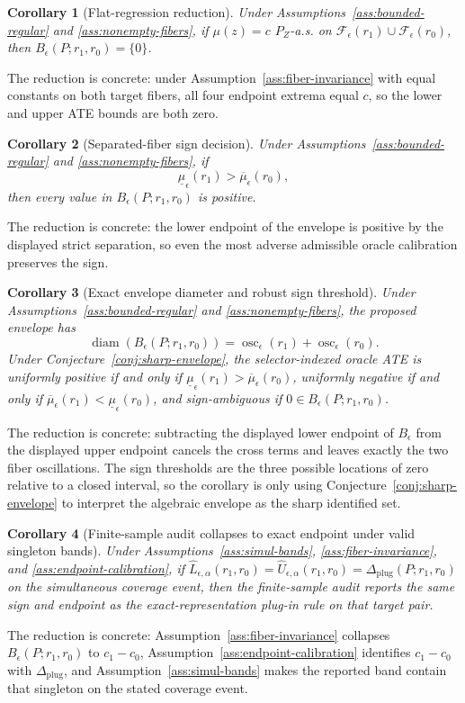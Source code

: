 \documentclass[11pt]{article}
\theoremstyle{definition}
\theoremstyle{plain}
\newtheorem{corollary}{Corollary}
\theoremstyle{remark}
\begin{document}
\begin{corollary}[Flat-regression reduction]\label{cor:flat}
Under Assumptions~\ref{ass:bounded-regular} and \ref{ass:nonempty-fibers}, if \(\mu(z)=c\) \(P_Z\)-a.s. on \(\mathcal F_\epsilon(r_1)\cup\mathcal F_\epsilon(r_0)\), then \(B_\epsilon(P;r_1,r_0)=\{0\}\).
\end{corollary}
The reduction is concrete: under Assumption~\ref{ass:fiber-invariance} with equal constants on both target fibers, all four endpoint extrema equal \(c\), so the lower and upper ATE bounds are both zero.

\begin{corollary}[Separated-fiber sign decision]\label{cor:separated}
Under Assumptions~\ref{ass:bounded-regular} and \ref{ass:nonempty-fibers}, if
\[
\underline\mu_\epsilon(r_1)>
\overline\mu_\epsilon(r_0),
\]
then every value in \(B_\epsilon(P;r_1,r_0)\) is positive.
\end{corollary}
The reduction is concrete: the lower endpoint of the envelope is positive by the displayed strict separation, so even the most adverse admissible oracle calibration preserves the sign.

\begin{corollary}[Exact envelope diameter and robust sign threshold]\label{cor:diameter-sign}
Under Assumptions~\ref{ass:bounded-regular} and \ref{ass:nonempty-fibers}, the proposed envelope has
\[
\operatorname{diam}(B_\epsilon(P;r_1,r_0))
=
\operatorname{osc}_\epsilon(r_1)+\operatorname{osc}_\epsilon(r_0).
\]
Under Conjecture~\ref{conj:sharp-envelope}, the selector-indexed oracle ATE is uniformly positive if and only if \(\underline\mu_\epsilon(r_1)>\overline\mu_\epsilon(r_0)\), uniformly negative if and only if \(\overline\mu_\epsilon(r_1)<\underline\mu_\epsilon(r_0)\), and sign-ambiguous if \(0\in B_\epsilon(P;r_1,r_0)\).
\end{corollary}
The reduction is concrete: subtracting the displayed lower endpoint of \(B_\epsilon\) from the displayed upper endpoint cancels the cross terms and leaves exactly the two fiber oscillations.  The sign thresholds are the three possible locations of zero relative to a closed interval, so the corollary is only using Conjecture~\ref{conj:sharp-envelope} to interpret the algebraic envelope as the sharp identified set.

\begin{corollary}[Finite-sample audit collapses to exact endpoint under valid singleton bands]\label{cor:band-collapse}
Under Assumptions~\ref{ass:simul-bands}, \ref{ass:fiber-invariance}, and \ref{ass:endpoint-calibration}, if \(\widehat L_{\epsilon,\alpha}(r_1,r_0)=\widehat U_{\epsilon,\alpha}(r_1,r_0)=\Delta_{\mathrm{plug}}(P;r_1,r_0)\) on the simultaneous coverage event, then the finite-sample audit reports the same sign and endpoint as the exact-representation plug-in rule on that target pair.
\end{corollary}
The reduction is concrete: Assumption~\ref{ass:fiber-invariance} collapses \(B_\epsilon(P;r_1,r_0)\) to \(c_1-c_0\), Assumption~\ref{ass:endpoint-calibration} identifies \(c_1-c_0\) with \(\Delta_{\mathrm{plug}}\), and Assumption~\ref{ass:simul-bands} makes the reported band contain that singleton on the stated coverage event.
\end{document}
